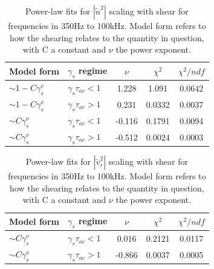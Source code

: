 \documentclass[aip,pop,amsmath,amssymb,preprint,superscriptaddress]{revtex4-1} %
\begin{document}
\begin{table}
\caption{\label{tab:table1}Power-law fits for $|\tilde{n}^{2}|$ scaling with shear for frequencies in 350Hz to 100kHz. Model form refers to how the shearing relates to the quantity in question, with C a constant and $\nu$ the power exponent.}
\begin{ruledtabular}
\begin{tabular}{llccc}
Model form&$\gamma_{s}$ regime&$\nu$&$\chi^2$&$\chi^2/ndf$\\
\hline
$\sim 1-C\gamma_{s}^\nu$&$\gamma_{s}\tau_{ac}<1$&1.228&1.091&0.0642\\
$\sim 1-C\gamma_{s}^\nu$&$\gamma_{s}\tau_{ac}>1$&0.231&0.0332&0.0037\\
$\sim C\gamma_{s}^\nu$&$\gamma_{s}\tau_{ac}<1$&-0.116&0.1791&0.0094\\
$\sim C\gamma_{s}^\nu$&$\gamma_{s}\tau_{ac}>1$&-0.512&0.0024&0.0003\\
\end{tabular}
\end{ruledtabular}
\end{table}

\begin{table}
\caption{\label{tab:table2}Power-law fits for $|\tilde{v}_{r}^{2}|$ scaling with shear for frequencies in 350Hz to 100kHz. Model form refers to how the shearing relates to the quantity in question, with C a constant and $\nu$ the power exponent.}
\begin{ruledtabular}
\begin{tabular}{llccc}
Model form&$\gamma_{s}$ regime&$\nu$&$\chi^2$&$\chi^2/ndf$\\
\hline
$\sim C\gamma_{s}^\nu$&$\gamma_{s}\tau_{ac}<1$&0.016&0.2121&0.0117\\
$\sim C\gamma_{s}^\nu$&$\gamma_{s}\tau_{ac}>1$&-0.866&0.0037&0.0005\\
\end{tabular}
\end{ruledtabular}
\end{table}
\end{document}
